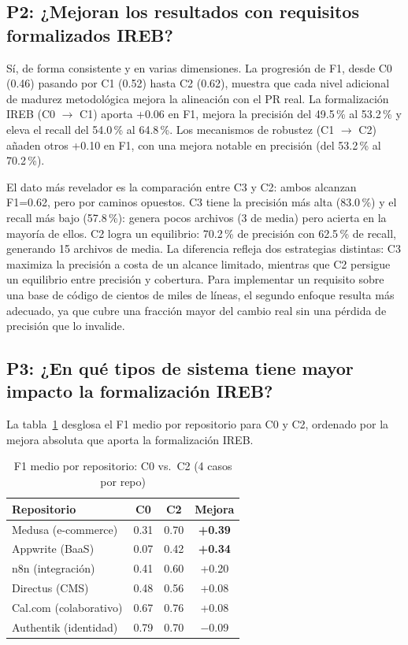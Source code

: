 \subsection{P2: ¿Mejoran los resultados con requisitos formalizados IREB?}

S\'i, de forma consistente y en varias dimensiones. La progresi\'on de F1, desde C0 (0.46) pasando por C1 (0.52) hasta C2 (0.62), muestra que cada nivel adicional de madurez metodol\'ogica mejora la alineaci\'on con el PR real. La formalizaci\'on IREB (C0 $\rightarrow$ C1) aporta +0.06 en F1, mejora la precisi\'on del 49.5\,\% al 53.2\,\% y eleva el recall del 54.0\,\% al 64.8\,\%. Los mecanismos de robustez (C1 $\rightarrow$ C2) a\~naden otros +0.10 en F1, con una mejora notable en precisi\'on (del 53.2\,\% al 70.2\,\%).

El dato m\'as revelador es la comparaci\'on entre C3 y C2: ambos alcanzan F1=0.62, pero por caminos opuestos. C3 tiene la precisi\'on m\'as alta (83.0\,\%) y el recall m\'as bajo (57.8\,\%): genera pocos archivos (3 de media) pero acierta en la mayor\'ia de ellos. C2 logra un equilibrio: 70.2\,\% de precisi\'on con 62.5\,\% de recall, generando 15 archivos de media. La diferencia refleja dos estrategias distintas: C3 maximiza la precisi\'on a costa de un alcance limitado, mientras que C2 persigue un equilibrio entre precisi\'on y cobertura. Para implementar un requisito sobre una base de c\'odigo de cientos de miles de l\'ineas, el segundo enfoque resulta m\'as adecuado, ya que cubre una fracci\'on mayor del cambio real sin una p\'erdida de precisi\'on que lo invalide.

\subsection{P3: ¿En qu\'e tipos de sistema tiene mayor impacto la formalizaci\'on IREB?}

La tabla~\ref{tab:f1-por-repo} desglosa el F1 medio por repositorio para C0 y C2, ordenado por la mejora absoluta que aporta la formalizaci\'on IREB.

\begin{table}[htbp]
\centering
\caption{F1 medio por repositorio: C0 vs.\ C2 (4 casos por repo)}
\label{tab:f1-por-repo}
\begin{tabular}{lccc}
\toprule
\textbf{Repositorio} & \textbf{C0} & \textbf{C2} & \textbf{Mejora} \\
\midrule
Medusa (e-commerce) & 0.31 & 0.70 & \textbf{+0.39} \\
Appwrite (BaaS) & 0.07 & 0.42 & \textbf{+0.34} \\
n8n (integraci\'on) & 0.41 & 0.60 & +0.20 \\
Directus (CMS) & 0.48 & 0.56 & +0.08 \\
Cal.com (colaborativo) & 0.67 & 0.76 & +0.08 \\
Authentik (identidad) & 0.79 & 0.70 & $-$0.09 \\
\bottomrule
\end{tabular}
\end{table}

